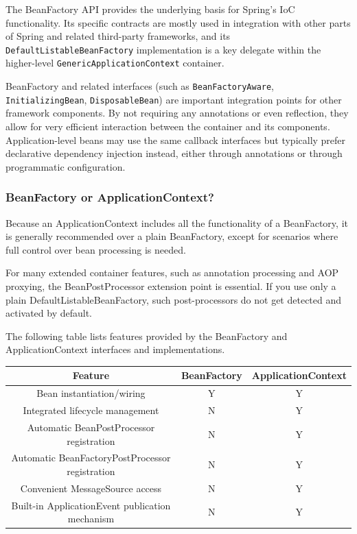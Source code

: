 \documentclass{scrartcl}
\begin{document}
The BeanFactory API provides the underlying basis for Spring’s IoC functionality. Its specific contracts are mostly used in integration with other parts of Spring and related third-party frameworks, and its \lstinline|DefaultListableBeanFactory| implementation is a key delegate within the higher-level \lstinline|GenericApplicationContext| container.

BeanFactory and related interfaces (such as \lstinline|BeanFactoryAware|, \lstinline|InitializingBean|, \lstinline|DisposableBean|) are important integration points for other framework components. By not requiring any annotations or even reflection, they allow for very efficient interaction between the container and its components. Application-level beans may use the same callback interfaces but typically prefer declarative dependency injection instead, either through annotations or through programmatic configuration.

\subsubsection{BeanFactory or ApplicationContext?}

Because an ApplicationContext includes all the functionality of a BeanFactory, it is generally recommended over a plain BeanFactory, except for scenarios where full control over bean processing is needed.

For many extended container features, such as annotation processing and AOP proxying, the BeanPostProcessor extension point is essential. If you use only a plain DefaultListableBeanFactory, such post-processors do not get detected and activated by default.

The following table lists features provided by the BeanFactory and ApplicationContext interfaces and implementations.

\begin{table}[h!]
\begin{tabular}{|c|c|c|}
    \hline
    Feature &  BeanFactory&  ApplicationContext\\
    \hline
    Bean instantiation/wiring&  Y&  Y\\
    \hline
    Integrated lifecycle management&  N&  Y\\
    \hline
    Automatic BeanPostProcessor registration&  N&  Y\\
    \hline
    Automatic BeanFactoryPostProcessor registration&  N&  Y\\
    \hline
    Convenient MessageSource access&  N&  Y\\
    \hline
    Built-in ApplicationEvent publication mechanism&  N&  Y\\
    \hline
    \hline
\end{tabular}
\end{table}
\end{document}
